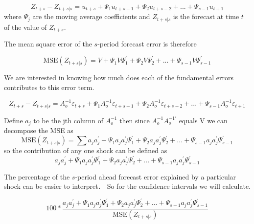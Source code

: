\documentclass{article}
\begin{document}
\begin{equation*}
Z_{t+s}-Z_{t+s|s}=u_{t+s}+\Psi _{1}u_{t+s-1}+\Psi _{2}u_{t+s-2}+...+\Psi
_{s-1}u_{t+1}
\end{equation*}
where $\Psi _{j}$ are the moving average coefficients and $Z_{t+s|s}$ is the
forecast at time $t$ of the value of $Z_{t+s}.$

The mean square error of the $s$-period forecast error is therefore

\begin{equation*}
\text{MSE}\left( Z_{t+s|s}\right) =V+\Psi _{1}V\Psi _{1}^{\prime }+\Psi
_{2}V\Psi _{2}^{\prime }+...+\Psi _{s-1}V\Psi _{s-1}^{\prime }
\end{equation*}

We are interested in knowing how much does each of the fundamental errors
contributes to this error term.

\begin{equation*}
Z_{t+s}-Z_{t+s|s}=A_{o}^{-1}\varepsilon _{t+s}+\Psi
_{1}A_{o}^{-1}\varepsilon _{t+s-1}+\Psi _{2}A_{o}^{-1}\varepsilon
_{t+s-2}+...+\Psi _{s-1}A_{o}^{-1}\varepsilon _{t+1}
\end{equation*}

Define $a_{j}$ to be the jth column of $A_{o}^{-1}$ then since $%
A_{o}^{-1}A_{o}^{-1\prime }$ equals V we can decompose the MSE as 
\begin{equation*}
\text{MSE}\left( Z_{t+s|s}\right) =\sum a_{j}a_{j}^{\prime }+\Psi
_{1}a_{j}a_{j}^{\prime }\Psi _{1}^{\prime }+\Psi _{2}a_{j}a_{j}^{\prime
}\Psi _{2}^{\prime }+...+\Psi _{s-1}a_{j}a_{j}^{\prime }\Psi _{s-1}^{\prime }
\end{equation*}
so the contribution of any one shock can be defined as 
\begin{equation*}
a_{j}a_{j}^{\prime }+\Psi _{1}a_{j}a_{j}^{\prime }\Psi _{1}^{\prime }+\Psi
_{2}a_{j}a_{j}^{\prime }\Psi _{2}^{\prime }+...+\Psi
_{s-1}a_{j}a_{j}^{\prime }\Psi _{s-1}^{\prime }
\end{equation*}

The percentage of the $s$-period ahead forecast error explained by a
particular shock can be easier to interpret\textbf{. \ }So for the
confidence intervals we will calculate.

\begin{equation*}
100\ast \frac{a_{j}a_{j}^{\prime }+\Psi _{1}a_{j}a_{j}^{\prime }\Psi
_{1}^{\prime }+\Psi _{2}a_{j}a_{j}^{\prime }\Psi _{2}^{\prime }+...+\Psi
_{s-1}a_{j}a_{j}^{\prime }\Psi _{s-1}^{\prime }}{\text{MSE}\left(
Z_{t+s|s}\right) }
\end{equation*}
\end{document}

